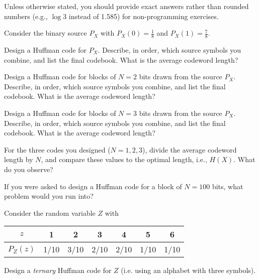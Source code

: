 \documentclass[a4paper,10pt,landscape,twocolumn]{scrartcl}
\begin{document}
\homeworkproblems

Unless otherwise stated, you should provide exact answers rather than rounded numbers (e.g., $\log 3$ instead of 1.585) for non-programming exercises.

\begin{exercise}
Consider the binary source $P_X$ with $P_X(0) = \frac{1}{8}$ and $P_X(1) = \frac{7}{8}$.
	\begin{subex}[(1pt)]
    Design a Huffman code for $P_X$. Describe, in order, which source symbols you combine, and list the final codebook. What is the average codeword length?
	\end{subex}
\begin{subex}[(1pt)]
	Design a Huffman code for blocks of $N=2$ bits drawn from the source $P_X$. Describe, in order, which source symbols you combine, and list the final codebook. What is the average codeword length?
\end{subex}
\begin{subex}[(1pt)]
	Design a Huffman code for blocks of $N=3$ bits drawn from the source $P_X$. Describe, in order, which source symbols you combine, and list the final codebook. What is the average codeword length?
\end{subex}
\begin{subex}[(2pt)]
	For the three codes you designed ($N=1,2,3$), divide the average codeword length by $N$, and compare these values to the optimal length, i.e., $H(X)$. What do you observe?
\end{subex}
	\begin{subex}[(1pt)]
	If you were asked to design a Huffman code for a block of $N = 100$ bits, what problem would you run into?
	\end{subex}
	\begin{subex}[(2pt)]
	Consider the random variable $Z$ with
	\begin{center}
	\begin{tabular}{c | c c c c c c}
	$z$ & 1 & 2 & 3 & 4 & 5 & 6\\
	\hline
	$P_Z(z)$ & 1/10 & 3/10 & 2/10 & 2/10 & 1/10 & 1/10\\
	\end{tabular}
	\end{center}
	Design a \emph{ternary} Huffman code for $Z$ (i.e. using an alphabet with three symbols).
	\end{subex}
\end{exercise}
\end{document}
